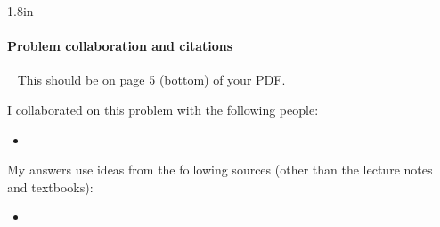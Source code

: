 \begin{answerBox}{1.8in}          %

  
  \paragraph{Problem  collaboration and citations}~\GradescopeComment
  {This should be on page 5 (bottom) of your PDF.}

  I collaborated on this problem with the following people:
  \begin{blue}
    \begin{itemize}
    \item \REPLACEME                    %
    \end{itemize}
  \end{blue}

  My answers use ideas from the following sources (other than the lecture notes and textbooks): 
  \begin{blue}
    \begin{itemize}
    \item \REPLACEME
    \end{itemize}
  \end{blue}

\end{answerBox}

